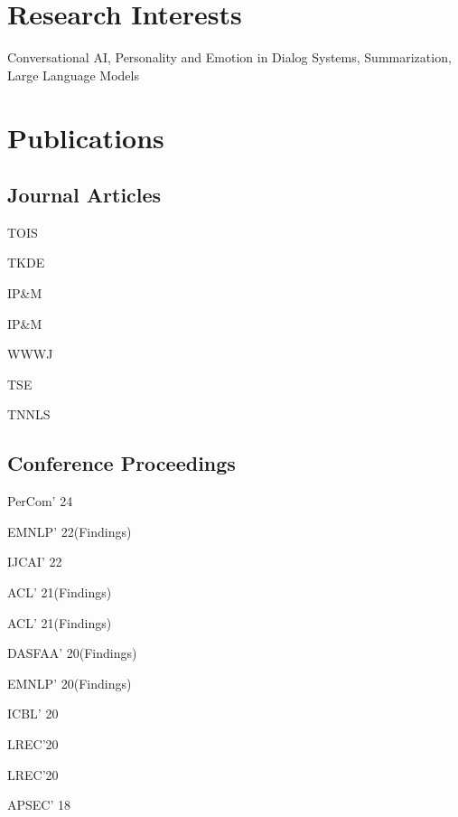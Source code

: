 \documentclass[12pt,letterpaper]{report}
\newcommand{\listitemspace}{0.5em}
\renewenvironment{itemize}
{\begin{list}{}{\setlength{\leftmargin}{0em}
                \setlength{\parskip}{0em}
                \setlength{\itemsep}{\listitemspace}
                \setlength{\parsep}{\listitemspace}}}
{\end{list}}
\begin{document}
    \section*{Research Interests}
    \begin{itemize}
      \item Conversational AI, Personality and Emotion in Dialog Systems, Summarization, Large Language Models
    \end{itemize}
    
    \section*{Publications}
    \subsection*{Journal Articles}
    \begin{tablist}
    	\item[TOIS] \tab{}
    	\item[TKDE] \tab{}
        \item[IP\&M] \tab{}
        \item[IP\&M] \tab{}
        \item[WWWJ] \tab{}
        \item[TSE] \tab{}
        \item[TNNLS] \tab{}
	\end{tablist}
    \subsection*{Conference Proceedings}
    \begin{tablist}
    	\item[PerCom' 24] \tab{}
    	\item[EMNLP' 22(Findings)] \tab{}
        \item[IJCAI' 22] \tab{}
        \item[ACL' 21(Findings)] \tab{}
        \item[ACL' 21(Findings)] \tab{}
        \item[DASFAA' 20(Findings)] \tab{}
        \item[EMNLP' 20(Findings)] \tab{}
        \item[ICBL' 20] \tab{}
        \item[LREC'20] \tab{}
        \item[LREC'20] \tab{}
        \item[APSEC' 18] \tab{}
    \end{tablist}
\end{document}

